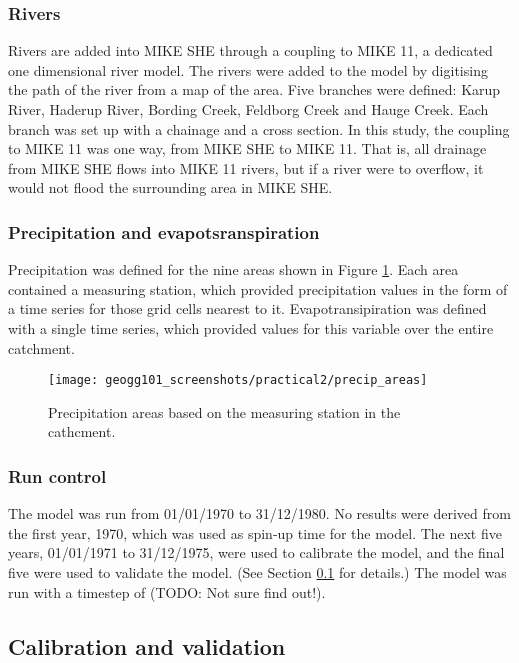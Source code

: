 \documentclass{article}
\begin{document}
\subsubsection{Rivers}

Rivers are added into MIKE SHE through a coupling to MIKE 11, a dedicated one dimensional river model. The rivers were added to the model by digitising the path of the river from a map of the area. Five branches were defined: Karup River, Haderup River, Bording Creek, Feldborg Creek and Hauge Creek. Each branch was set up with a chainage and a cross section. In this study, the coupling to MIKE 11 was one way, from MIKE SHE to MIKE 11. That is, all drainage from MIKE SHE flows into MIKE 11 rivers, but if a river were to overflow, it would not flood the surrounding area in MIKE SHE.

\subsubsection{Precipitation and evapotsranspiration}

Precipitation was defined for the nine areas shown in Figure \ref{fig:precip_areas}. Each area contained a measuring station, which provided precipitation values in the form of a time series for those grid cells nearest to it. Evapotransipiration was defined with a single time series, which provided values for this variable over the entire catchment.

\begin{figure}[!h]
    \centering
    \texttt{[image: geogg101\_screenshots/practical2/precip\_areas]}
    \caption{Precipitation areas based on the measuring station in the cathcment.}
    \label{fig:precip_areas}
\end{figure}


\subsubsection{Run control}
The model was run from 01/01/1970 to 31/12/1980. No results were derived from the first year, 1970, which was used as spin-up time for the model. The next five years, 01/01/1971 to 31/12/1975, were used to calibrate the model, and the final five were used to validate the model. (See Section \ref{sec:calibration} for details.) The model was run with a timestep of (TODO: Not sure find out!).

\subsection{Calibration and validation}
\label{sec:calibration}
\end{document}
